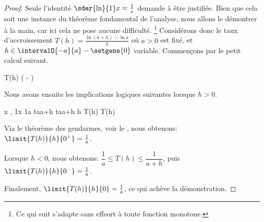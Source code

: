 \begin{proof}
	Seule l'identité $\sder{\ln}{1} x = \frac1x$ demande à être justifiée.
	Bien que cela soit une instance du théorème fondamental de l'analyse, nous allons le démontrer à la main, car ici cela ne pose aucune difficulté.%
	\footnote{
		Ce qui suit s'adapte sans effeort à toute fonction monotone.
	}
	Considérons donc le taux d'accroissement $T(h) = \frac{\ln(a+h) - \ln a}{h}$ où $a > 0$ est fixé,
	et
	$h \in \intervalO{-a}{a} - \setgene{0}$ variable.
	Commençons par le petit calcul suivant.

	\begin{stepcalc}[style=sar]
		T(h)
	\explnext{}
		 \Big(
			 - 
		\Big)
		 
	\end{stepcalc}
	
	Nous avons ensuite les implications logiques suivantes lorsque $h > 0$.
	
	\begin{stepcalc}[style=ar*, ope=\implies]
	\explnext{}
		\forall x \in \intervalC{a}{a+h},
		 \leq \dfrac1x \leq \dfrac1a
		\leq {}      {t}{a}{a+h}
		\leq {}      {t}{a}{a+h}
	\explnext{}
	     \leq h T(h) \leq {}
		 \leq T(h)\leq {}
	\end{stepcalc}
	
	Via le théorème des gendarmes, voir le , nous obtenons:
	$\limit{T(h)}{h}{0^+} = \frac1a$.

	Lorsque $h < 0$, nous obtenons:
	$\dfrac{1}{a} \leq T(h) \leq \dfrac{1}{a+h}$,
	puis
	$\limit{T(h)}{h}{0^-} = \frac1a$.
	
	Finalement,
	$\limit{T(h)}{h}{0} = \frac1a$, ce qui achève la démonstration.
\end{proof}

